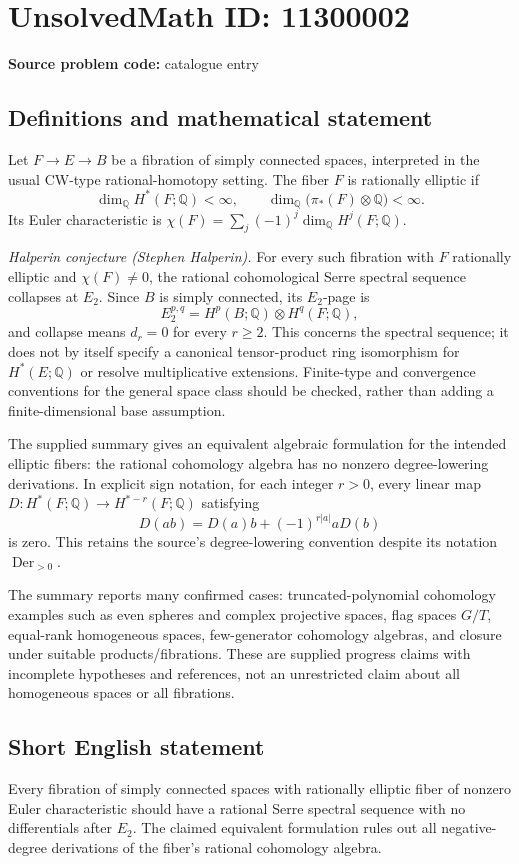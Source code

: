 \documentclass[11pt]{article}
\newcommand{\Q}{\mathbb{Q}}
\begin{document}
\section*{UnsolvedMath ID: 11300002}
\textbf{Source problem code:} catalogue entry
\subsection{Definitions and mathematical statement}
Let \(F\to E\to B\) be a fibration of simply connected spaces, interpreted in the usual CW-type rational-homotopy setting. The fiber \(F\) is rationally elliptic if
\[
 \dim_\Q H^*(F;\Q)<\infty,
 \qquad\dim_\Q\bigl(\pi_*(F)\otimes\Q\bigr)<\infty.
\]
Its Euler characteristic is \(\chi(F)=\sum_j(-1)^j\dim_\Q H^j(F;\Q)\).

\emph{Halperin conjecture (Stephen Halperin).} For every such fibration with \(F\) rationally elliptic and \(\chi(F)\neq0\), the rational cohomological Serre spectral sequence collapses at \(E_2\). Since \(B\) is simply connected, its \(E_2\)-page is
\[
 E_2^{p,q}=H^p(B;\Q)\otimes H^q(F;\Q),
\]
and collapse means \(d_r=0\) for every \(r\geq2\). This concerns the spectral sequence; it does not by itself specify a canonical tensor-product ring isomorphism for \(H^*(E;\Q)\) or resolve multiplicative extensions. Finite-type and convergence conventions for the general space class should be checked, rather than adding a finite-dimensional base assumption.

The supplied summary gives an equivalent algebraic formulation for the intended elliptic fibers: the rational cohomology algebra has no nonzero degree-lowering derivations. In explicit sign notation, for each integer \(r>0\), every linear map \(D:H^*(F;\Q)\to H^{*-r}(F;\Q)\) satisfying
\[
 D(ab)=D(a)b+(-1)^{r|a|}aD(b)
\]
is zero. This retains the source's degree-lowering convention despite its notation \(\operatorname{Der}_{>0}\).

The summary reports many confirmed cases: truncated-polynomial cohomology examples such as even spheres and complex projective spaces, flag spaces \(G/T\), equal-rank homogeneous spaces, few-generator cohomology algebras, and closure under suitable products/fibrations. These are supplied progress claims with incomplete hypotheses and references, not an unrestricted claim about all homogeneous spaces or all fibrations.
\subsection{Short English statement}
Every fibration of simply connected spaces with rationally elliptic fiber of nonzero Euler characteristic should have a rational Serre spectral sequence with no differentials after \(E_2\). The claimed equivalent formulation rules out all negative-degree derivations of the fiber's rational cohomology algebra.
\end{document}
